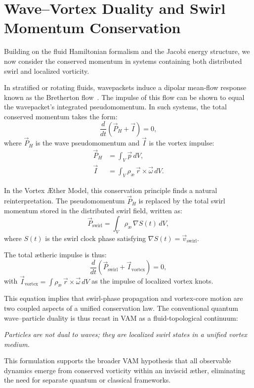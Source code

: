 \section*{Wave–Vortex Duality and Swirl Momentum Conservation}

Building on the fluid Hamiltonian formalism and the Jacobi energy structure, we now consider the conserved momentum in systems containing both distributed swirl and localized vorticity.

In stratified or rotating fluids, wavepackets induce a dipolar mean-flow response known as the Bretherton flow~\cite{buhler2005wave}. The impulse of this flow can be shown to equal the wavepacket’s integrated pseudomomentum. In such systems, the total conserved momentum takes the form:
\begin{equation}
    \frac{d}{dt} \left( \vec{P}_H + \vec{I} \right) = 0,
\end{equation}
where \( \vec{P}_H \) is the wave pseudomomentum and \( \vec{I} \) is the vortex impulse:
\begin{align}
    \vec{P}_H &= \int_V \vec{p} \, dV, \\
    \vec{I} &= \int_V \rho_\text{\ae} \, \vec{r} \times \vec{\omega} \, dV.
\end{align}

In the Vortex Æther Model, this conservation principle finds a natural reinterpretation. The pseudomomentum \( \vec{P}_H \) is replaced by the total swirl momentum stored in the distributed swirl field, written as:
\begin{equation}
    \vec{P}_\text{swirl} = \int_V \rho_\text{\ae} \, \nabla S(t) \, dV,
\end{equation}
where \( S(t) \) is the swirl clock phase satisfying \( \nabla S(t) = \vec{v}_\text{swirl} \).

The total ætheric impulse is thus:
\begin{equation}
    \frac{d}{dt} \left( \vec{P}_\text{swirl} + \vec{I}_\text{vortex} \right) = 0,
\end{equation}
with \( \vec{I}_\text{vortex} = \int \rho_\text{\ae} \, \vec{r} \times \vec{\omega} \, dV \) as the impulse of localized vortex knots.

This equation implies that swirl-phase propagation and vortex-core motion are two coupled aspects of a unified conservation law. The conventional quantum wave–particle duality is thus recast in VAM as a fluid-topological continuum:
\begin{center}
    \emph{Particles are not dual to waves; they are localized swirl states in a unified vortex medium.}
\end{center}
This formulation supports the broader VAM hypothesis that all observable dynamics emerge from conserved vorticity within an inviscid æther, eliminating the need for separate quantum or classical frameworks.




